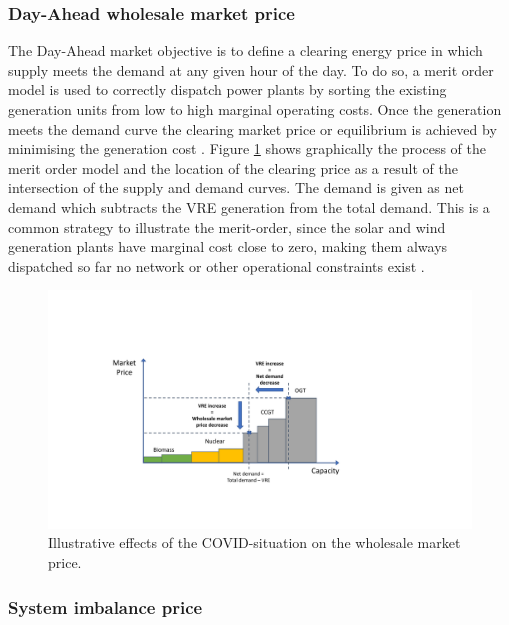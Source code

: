 \documentclass[energies,article,submit,moreauthors,pdftex]{Definitions/mdpi}
\begin{document}
\subsubsection{Day-Ahead wholesale market price}\label{sec:day-ahead wholesale market price}

The Day-Ahead market objective is to define a clearing energy price in which supply meets the demand at any given hour of the day. To do so, a merit order model is used to correctly dispatch power plants by sorting the existing generation units from low to high marginal operating costs. Once the generation meets the demand curve the clearing market price or equilibrium is achieved by minimising the generation cost \cite{Maekawa2018TheExchange}. Figure \ref{fig:wholesale-market-effects} shows graphically the process of the merit order model and the location of the clearing price as a result of the intersection of the supply and demand curves. The demand is given as net demand which subtracts the VRE generation from the total demand. This is a common strategy to illustrate the merit-order, since the solar and wind generation plants have marginal cost close to zero, making them always dispatched so far no network or other operational constraints exist \cite{Hirth2014TheVariability}. 

\begin{figure}[H]
\centering
\hspace{-25pt}
\includegraphics[trim={4cm 3cm 3.5cm 4.5cm},clip,width=1.3\textwidth]{Graphics/Wholesale-market-price.pdf}
\caption{Illustrative effects of the COVID-situation on the wholesale market price.}
\label{fig:wholesale-market-effects}
\end{figure} 


\subsubsection{System imbalance price}\label{sec:system imbalance price}
\end{document}
